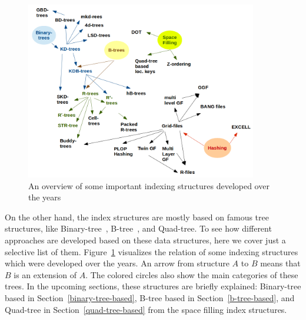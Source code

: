\documentclass[a4paper,12pt]{article}
\begin{document}
\begin{figure}
\centering
\includegraphics[width=0.9\textwidth]{Trees}
\caption{An overview of some important indexing structures developed over the years}
\label{trees}
\end{figure}

On the other hand, the index structures are mostly based on famous tree structures, like Binary-tree~\cite{binarytree}, B-tree~\cite{btree}, and Quad-tree. 
To see how different approaches are developed based on these data structures, here we cover just a selective list of them. Figure~\ref{trees} visualizes the relation of some indexing structures which were developed over the years. An arrow from structure $A$ to $B$ means that $B$ is an extension of $A$. The colored circles also show the main categories of these
trees. In the upcoming sections, these structures are briefly explained:
Binary-tree based in Section~\ref{binary-tree-based}, 
B-tree based in Section~\ref{b-tree-based}, 
and Quad-tree in Section~\ref{quad-tree-based} from the space filling index structures.
\end{document}
